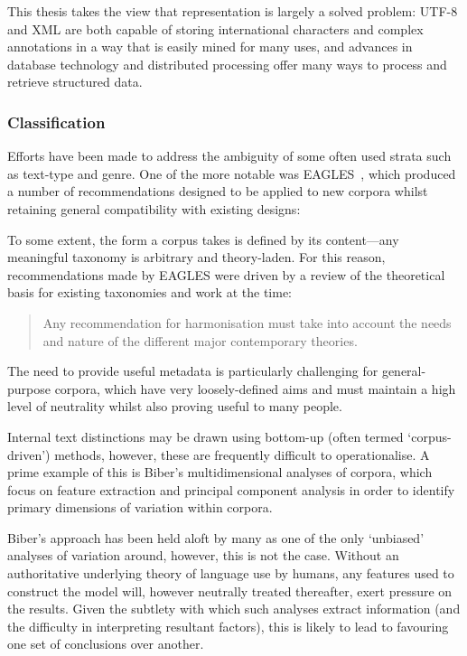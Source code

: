 This thesis takes the view that representation is largely a solved problem: UTF-8 and XML are both capable of storing international characters and complex annotations in a way that is easily mined for many uses, and advances in database technology and distributed processing offer many ways to process and retrieve structured data.




\subsubsection{Classification}
Efforts have been made to address the ambiguity of some often used strata such as text-type and genre.  One of the more notable was EAGLES~\cite{EagTcwgCtypeaglespreliminary}, which produced a number of recommendations designed to be applied to new corpora whilst retaining general compatibility with existing designs:


To some extent, the form a corpus takes is defined by its content---any meaningful taxonomy is arbitrary and theory-laden.  For this reason, recommendations made by EAGLES were driven by a review of the theoretical basis for existing taxonomies and work at the time:

\begin{quote}
Any recommendation for harmonisation must take into account the needs and nature of the different major contemporary theories.
\end{quote}

The need to provide useful metadata is particularly challenging for general-purpose corpora, which have very loosely-defined aims and must maintain a high level of neutrality whilst also proving useful to many people.




Internal text distinctions may be drawn using bottom-up (often termed `corpus-driven') methods, however, these are frequently difficult to operationalise.  A prime example of this is Biber's multidimensional analyses of corpora\cite{biber1992complexity}, which focus on feature extraction and principal component analysis in order to identify primary dimensions of variation within corpora.

Biber's approach has been held aloft by many as one of the only `unbiased' analyses of variation around, however, this is not the case.  Without an authoritative underlying theory of language use by humans, any features used to construct the model will, however neutrally treated thereafter, exert pressure on the results.  Given the subtlety with which such analyses extract information (and the difficulty in interpreting resultant factors), this is likely to lead to favouring one set of conclusions over another.

